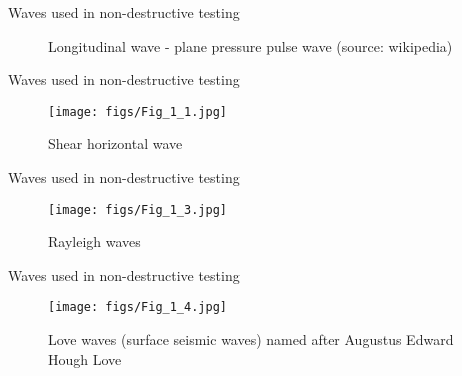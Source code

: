 \documentclass[10pt,aspectratio=169]{beamer} %
\begin{document}
\begin{frame}{Waves used in non-destructive testing}
	\begin{figure}
		\caption{\alert{Longitudinal wave}  - plane pressure pulse wave (source: wikipedia)}
	\end{figure}
\end{frame}
\begin{frame}{Waves used in non-destructive testing}
	\begin{figure}
		\texttt{[image: figs/Fig\_1\_1.jpg]}
		\caption{\alert{Shear horizontal wave} }
	\end{figure}
\end{frame}
\note{
	
}
\begin{frame}{Waves used in non-destructive testing}
	\begin{figure}
		\texttt{[image: figs/Fig\_1\_3.jpg]}
		\caption{\alert{Rayleigh waves} }
	\end{figure}
\end{frame}
\note{
	
}
\begin{frame}{Waves used in non-destructive testing}
	\begin{figure}
		\texttt{[image: figs/Fig\_1\_4.jpg]}
		\caption{\alert{Love waves} (surface seismic waves) named after Augustus Edward Hough Love }
	\end{figure}
\end{frame}
\note{
	
}
\end{document}
